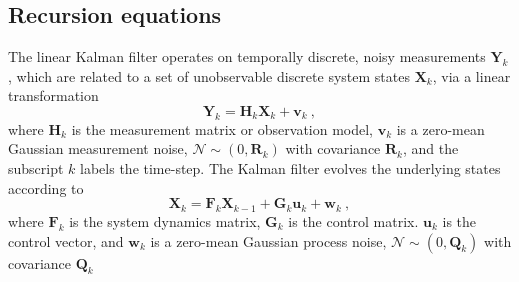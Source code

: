 \documentclass[fleqn,usenatbib,useAMS]{mnras}
\begin{document}
\subsection{Recursion equations}\label{sec_kalman_general}
The linear Kalman filter operates on temporally discrete, noisy measurements $\boldsymbol{Y}_k$, which are related to a set of unobservable discrete system states $\boldsymbol{X}_k$, via a linear transformation
\begin{equation}
	\boldsymbol{Y}_k = \boldsymbol{H}_k \boldsymbol{X}_k + \boldsymbol{v}_k \ ,\label{eq:kalman1}
\end{equation}
where $\boldsymbol{H}_k$ is the measurement matrix or observation model, $\boldsymbol{v}_k$ is a zero-mean Gaussian measurement noise, $\mathcal{N} \sim (0,\boldsymbol{R}_k)$ with covariance $\boldsymbol{R}_k$, and the subscript $k$ labels the time-step. The Kalman filter evolves the underlying states according to
\begin{equation}
	\boldsymbol{X}_k = \boldsymbol{F}_k \boldsymbol{X}_{k-1} + \boldsymbol{G}_k \boldsymbol{u}_k + \boldsymbol{w}_k \ , \label{eq:kalman2}
\end{equation}
where $\boldsymbol{F}_k$ is the system dynamics matrix, $\boldsymbol{G}_k$ is the control matrix. $\boldsymbol{u}_k$ is the control vector, and $\boldsymbol{w}_k$ is a zero-mean Gaussian process noise, $\mathcal{N} \sim (0,\boldsymbol{Q}_k)$ with covariance $\boldsymbol{Q}_k$ \newline 
\end{document}
